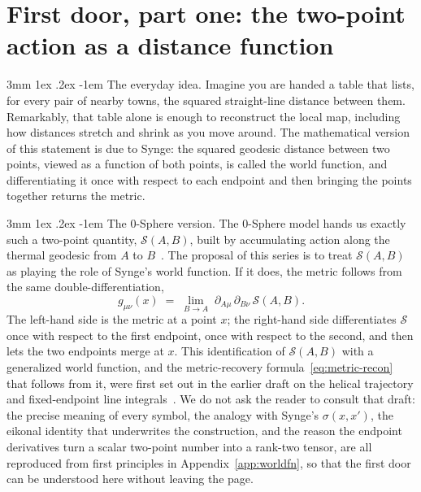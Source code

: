 \documentclass[%
 reprint, amsmath,amssymb, aps, prb, ]{revtex4-2}
\makeatletter
\numberwithin{equation}{section}
\renewcommand\paragraph{%
  \@startsection{paragraph}{4}{\z@}%
    {3mm \@plus 1ex \@minus .2ex}%
    {-1em}%
    {\normalfont\normalsize\itshape}}
\makeatother
\begin{document}
\section{First door, part one: the two-point action as a distance function}
\label{sec:distance}

\paragraph{The everyday idea.}
Imagine you are handed a table that lists, for every pair of nearby towns, the squared straight-line distance between them. Remarkably, that table alone is enough to reconstruct the local map, including how distances stretch and shrink as you move around. The mathematical version of this statement is due to Synge: the squared geodesic distance between two points, viewed as a function of both points, is called the world function, and differentiating it once with respect to each endpoint and then bringing the points together returns the metric.

\paragraph{The 0-Sphere version.}
The 0-Sphere model hands us exactly such a two-point quantity, $\mathcal{S}(A,B)$, built by accumulating action along the thermal geodesic from $A$ to $B$~\cite{hanamura24,hanamura29,hanamura51}. The proposal of this series is to treat $\mathcal{S}(A,B)$ as playing the role of Synge's world function. If it does, the metric follows from the same double-differentiation,
\begin{equation}
g_{\mu\nu}(x) \;=\; \lim_{B\to A}\; \partial_{A\mu}\,\partial_{B\nu}\,\mathcal{S}(A,B).
\label{eq:metric-recon}
\end{equation}
The left-hand side is the metric at a point $x$; the right-hand side differentiates $\mathcal{S}$ once with respect to the first endpoint, once with respect to the second, and then lets the two endpoints merge at $x$. This identification of $\mathcal{S}(A,B)$ with a generalized world function, and the metric-recovery formula~\eqref{eq:metric-recon} that follows from it, were first set out in the earlier draft on the helical trajectory and fixed-endpoint line integrals~\cite{hanamura51}. We do not ask the reader to consult that draft: the precise meaning of every symbol, the analogy with Synge's $\sigma(x,x')$, the eikonal identity that underwrites the construction, and the reason the endpoint derivatives turn a scalar two-point number into a rank-two tensor, are all reproduced from first principles in Appendix~\ref{app:worldfn}, so that the first door can be understood here without leaving the page.
\end{document}
